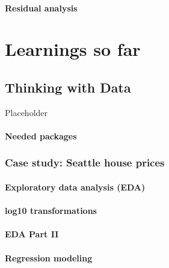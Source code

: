 \documentclass[12pt, krantz2,]{krantz}
\begin{document}
\hypertarget{model4residuals}{%
\subsection{Residual analysis}\label{model4residuals}}

\hypertarget{part-learnings-so-far}{%
\part{Learnings so far}\label{part-learnings-so-far}}

\hypertarget{thinking-with-data}{%
\chapter{Thinking with Data}\label{thinking-with-data}}

Placeholder

\hypertarget{needed-packages-9}{%
\subsection*{Needed packages}\label{needed-packages-9}}


\hypertarget{seattle-house-prices}{%
\section{Case study: Seattle house prices}\label{seattle-house-prices}}

\hypertarget{house-prices-EDA-I}{%
\subsection{Exploratory data analysis (EDA)}\label{house-prices-EDA-I}}

\hypertarget{log10-transformations}{%
\subsection{log10 transformations}\label{log10-transformations}}

\hypertarget{eda-part-ii}{%
\subsection{EDA Part II}\label{eda-part-ii}}

\hypertarget{house-prices-regression}{%
\subsection{Regression modeling}\label{house-prices-regression}}
\end{document}
